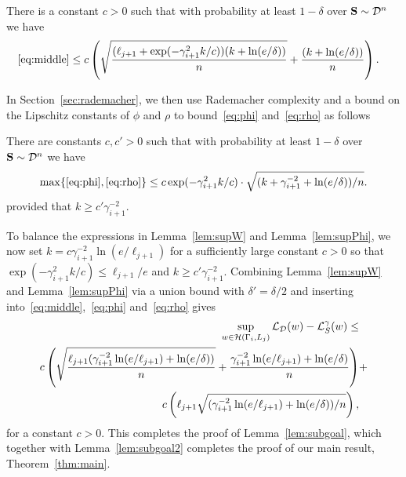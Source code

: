 \begin{lemma}
\label{lem:supW}
There is a constant $c>0$ such that with probability at least $1-\delta$ over $\mathbf{S} \sim \mathcal{D}^n$ we have
\begin{align*}
    \eqref{eq:middle} &\leq c \left(\sqrt{\frac{(\ell_{j+1}+ \exp(-\gamma_{i+1}^2k/c)) (k + \ln(e/\delta))}{n}} + \frac{(k + \ln(e/\delta))}{n} \right).
\end{align*}
\end{lemma}
In Section~\ref{sec:rademacher}, we then use Rademacher complexity and a bound on the Lipschitz constants of $\phi$ and $\rho$ to bound~\eqref{eq:phi} and~\eqref{eq:rho} as follows
\begin{lemma}
\label{lem:supPhi}
There are constants $c,c'>0$ such that with probability at least $1-\delta$ over $\mathbf{S} \sim \mathcal{D}^n$ we have
\begin{align*}
\max\{\eqref{eq:phi}, \eqref{eq:rho} \}\leq
c\exp(-\gamma_{i+1}^2k/c) \cdot \sqrt{(k + \gamma_{i+1}^{-2} + \ln(e/\delta))/n} .
\end{align*}
provided that $k \geq c' \gamma_{i+1}^{-2}$. 
\end{lemma}
To balance the expressions in Lemma~\ref{lem:supW} and Lemma~\ref{lem:supPhi}, we now set $k = c \gamma_{i+1}^{-2} \ln(e/\ell_{j+1})$ for a sufficiently large constant $c>0$ so that $\exp(-\gamma_{i+1}^2 k/c) \leq \ell_{j+1}/e$ and $k \geq c'\gamma_{i+1}^{-2}$. Combining Lemma~\ref{lem:supW} and Lemma~\ref{lem:supPhi} via a union bound with $\delta'=\delta/2$ and inserting into~\eqref{eq:middle},~\eqref{eq:phi} and~\eqref{eq:rho} gives
\begin{align*}
\sup_{w \in \mathcal{H}(\Gamma_i, L_j)} \mathcal{L}_{\mathcal{D}}(w) - \mathcal{L}^\gamma_S(w) \leq& \\c\left(\sqrt{\frac{\ell_{j+1}(\gamma_{i+1}^{-2}\ln(e/\ell_{j+1}) + \ln(e/\delta))}{n}}  + \frac{\gamma_{i+1}^{-2} \ln(e/\ell_{j+1})+\ln(e/\delta)}{n}\right) &+\\
c \left( \ell_{j+1} \sqrt{(\gamma_{i+1}^{-2} \ln(e/\ell_{j+1}) + \ln(e/\delta))/n} \right),
\end{align*}
for a constant $c>0$. This completes the proof of Lemma~\ref{lem:subgoal}, which together with Lemma~\ref{lem:subgoal2} completes the proof of our main result, Theorem~\ref{thm:main}.